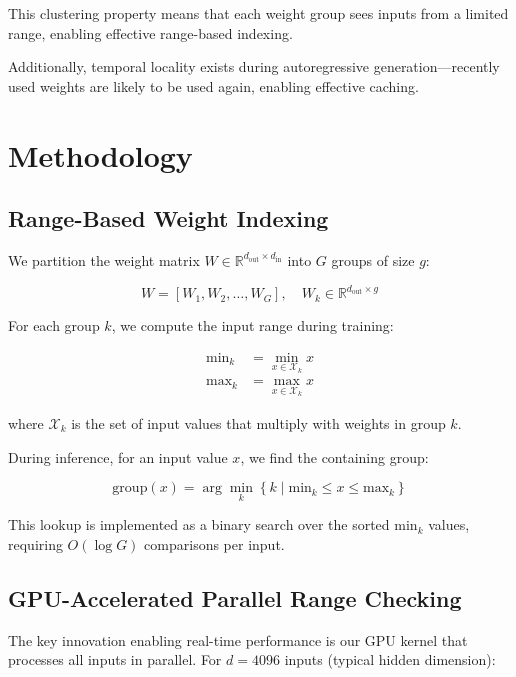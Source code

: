 \documentclass[twocolumn,10pt]{article}
\begin{document}
This clustering property means that each weight group sees inputs from a limited range, enabling effective range-based indexing.

Additionally, temporal locality exists during autoregressive generation—recently used weights are likely to be used again, enabling effective caching.

\section{Methodology}

\subsection{Range-Based Weight Indexing}

We partition the weight matrix $W \in \mathbb{R}^{d_{\text{out}} \times d_{\text{in}}}$ into $G$ groups of size $g$:

\begin{equation}
W = [W_1, W_2, \ldots, W_G], \quad W_k \in \mathbb{R}^{d_{\text{out}} \times g}
\end{equation}

For each group $k$, we compute the input range during training:

\begin{align}
\text{min}_k &= \min_{x \in \mathcal{X}_k} x \\
\text{max}_k &= \max_{x \in \mathcal{X}_k} x
\end{align}

where $\mathcal{X}_k$ is the set of input values that multiply with weights in group $k$.

During inference, for an input value $x$, we find the containing group:

\begin{equation}
\text{group}(x) = \arg\min_{k} \left\{ k \mid \text{min}_k \leq x \leq \text{max}_k \right\}
\end{equation}

This lookup is implemented as a binary search over the sorted $\text{min}_k$ values, requiring $O(\log G)$ comparisons per input.

\subsection{GPU-Accelerated Parallel Range Checking}

The key innovation enabling real-time performance is our GPU kernel that processes all inputs in parallel. For $d = 4096$ inputs (typical hidden dimension):
\end{document}
